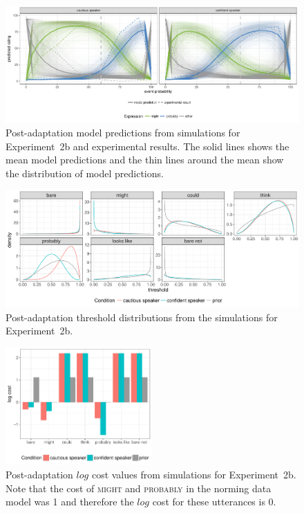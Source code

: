\documentclass[man, floatsintext]{apa6}
\begin{document}
\begin{figure}[h!]
  \includegraphics[width=\textwidth]{plots/adaptation-posterior-predictions-replication.pdf}
  \caption{Post-adaptation model predictions from simulations for Experiment~2b and experimental results. 
  The solid lines shows the mean model predictions and the thin lines around the mean show the distribution of model predictions. \label{fig:post-exposure-model-replication}}
\end{figure}

\begin{figure}[h!]
  \includegraphics[width=\textwidth]{plots/adaptation-posterior-thresholds-replication.pdf}
  \caption{Post-adaptation threshold distributions from the simulations for Experiment~2b. \label{fig:post-exposure-thresholds-replication}}
\end{figure}

\begin{figure}[h!]
\center
  \includegraphics[width=0.5\textwidth]{plots/adaptation-posterior-costs-replication.pdf}
  \caption{Post-adaptation $log$ cost values from simulations for Experiment~2b. Note that the cost of \textsc{might} and \textsc{probably} 
  in the norming data model was 1 and therefore the $log$ cost for these utterances is 0.  \label{fig:post-exposure-costs-replication}}
\end{figure}
\end{document}

